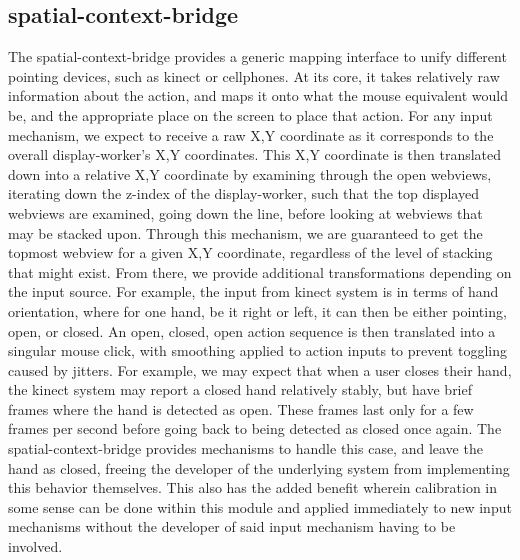 
\subsection{spatial-context-bridge}


The spatial-context-bridge provides a generic mapping interface to unify different pointing
devices, such as kinect or cellphones. At its core, it takes relatively raw information about
the action, and maps it onto what the mouse equivalent would be, and the appropriate place
on the screen to place that action. For any input mechanism, we expect to receive a raw
X,Y coordinate as it corresponds to the overall display-worker's X,Y coordinates. This X,Y
coordinate is then translated down into a relative X,Y coordinate by examining through the
open webviews, iterating down the z-index of the display-worker, such that the top displayed
webviews are examined, going down the line, before looking at webviews that may be stacked
upon. Through this mechanism, we are guaranteed to get the topmost webview for a given X,Y
coordinate, regardless of the level of stacking that might exist. From there, we provide
additional transformations depending on the input source. For example, the input from
kinect system is in terms of hand orientation, where for one hand, be it right or left, it
can then be either pointing, open, or closed. An open, closed, open action sequence is
then translated into a singular mouse click, with smoothing applied to action inputs to
prevent toggling caused by jitters. For example, we may expect that when a user closes
their hand, the kinect system may report a closed hand relatively stably, but have brief
frames where the hand is detected as open. These frames last only for a few frames per
second before going back to being detected as closed once again. The spatial-context-bridge
provides mechanisms to handle this case, and leave the hand as closed, freeing the
developer of the underlying system from implementing this behavior themselves. This also
has the added benefit wherein calibration in some sense can be done within this module
and applied immediately to new input mechanisms without the developer of said input
mechanism having to be involved.

